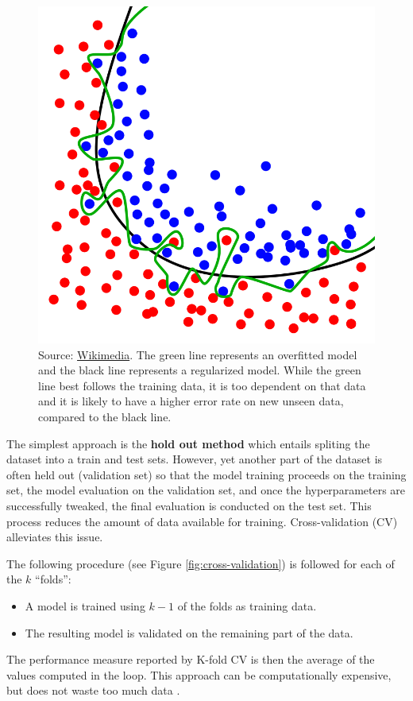 \documentclass[
]{book}
\providecommand{\tightlist}{%
  \setlength{\itemsep}{0pt}\setlength{\parskip}{0pt}}
\begin{document}
\begin{figure}

{\centering \includegraphics[width=0.45\linewidth]{Figures/Overfitting} 

}

\caption{Source: \href{https://en.wikipedia.org/wiki/File:Overfitting.svg}{Wikimedia}. The green line represents an overfitted model and the black line represents a regularized model. While the green line best follows the training data, it is too dependent on that data and it is likely to have a higher error rate on new unseen data, compared to the black line.}\label{fig:overfitting}
\end{figure}

The simplest approach is the \textbf{hold out method} which entails spliting the dataset into a train and test sets. However, yet another part of the dataset is often held out (validation set) so that the model training proceeds on the training set, the model evaluation on the validation set, and once the hyperparameters are successfully tweaked, the final evaluation is conducted on the test set. This process reduces the amount of data available for training. Cross-validation (CV) alleviates this issue.

The following procedure (see Figure \ref{fig:cross-validation}) is followed for each of the \(k\) ``folds'':

\begin{itemize}
\tightlist
\item
  A model is trained using \(k-1\) of the folds as training data.
\item
  The resulting model is validated on the remaining part of the data.
\end{itemize}

The performance measure reported by K-fold CV is then the average of the values computed in the loop. This approach can be computationally expensive, but does not waste too much data \citep{scikit-learn}.
\end{document}
